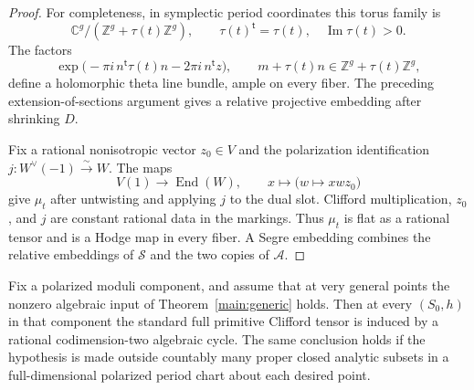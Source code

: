 \begin{proof}
For completeness, in symplectic period coordinates this torus family
is
\[
 \mathbb C^g/(\mathbb Z^g+\tau(t)\mathbb Z^g),
 \qquad \tau(t)^{\mathsf t}=\tau(t),\quad
          \operatorname{Im}\tau(t)>0.
\]
The factors
\[
 \exp\bigl(-\pi i\,n^{\mathsf t}\tau(t)n
               -2\pi i\,n^{\mathsf t}z\bigr),
 \qquad m+\tau(t)n\in\mathbb Z^g+\tau(t)\mathbb Z^g,
\]
define a holomorphic theta line bundle, ample on every fiber.
The preceding extension-of-sections argument gives a relative
projective embedding after shrinking $D$.

Fix a rational nonisotropic vector $z_0\in V$ and the
polarization identification $j:W^\vee(-1)\xrightarrow{\sim}W$.
The maps
\[
 V(1)\longrightarrow\operatorname{End}(W),
 \qquad x\longmapsto\bigl(w\longmapsto xwz_0\bigr)
\]
give $\mu_t$ after untwisting and applying $j$ to the dual slot.
Clifford multiplication, $z_0$, and $j$ are constant rational data in
the markings.  Thus $\mu_t$ is flat as a rational tensor and is a Hodge
map in every fiber.  A Segre embedding combines the relative embeddings
of $\mathcal S$ and the two copies of $\mathcal A$.
\end{proof}

\begin{corollary}
\label{spec:primitive}
Fix a polarized moduli component, and assume that at very general
points the nonzero algebraic input of Theorem~\ref{main:generic} holds.
Then at every $(S_0,h)$ in that component the standard full primitive
Clifford tensor is induced by a rational codimension-two algebraic
cycle.  The same conclusion holds if the hypothesis is made outside
countably many proper closed analytic subsets in a full-dimensional
polarized period chart about each desired point.
\end{corollary}

